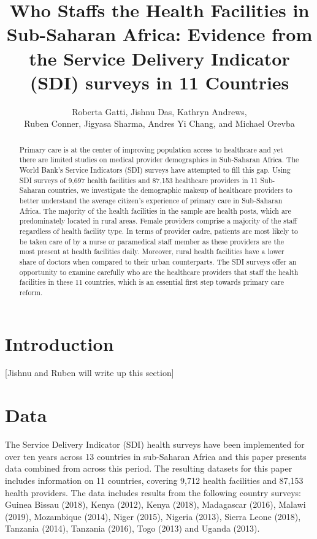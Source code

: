\documentclass{article}                 %
\title{\color{Black} Who Staffs the Health Facilities in Sub-Saharan Africa: Evidence from the Service Delivery Indicator (SDI) surveys in 11 Countries}
\author{\color{Black} Roberta Gatti, Jishnu Das, Kathryn  Andrews, \\
	Ruben Conner,  Jigyasa Sharma, Andres Yi Chang, and Michael Orevba}
\begin{document}
	
	\maketitle        
	\sectionfont{\color{Black}}
	

	\begin{abstract}
		Primary care is at the center of improving population access to healthcare and yet there are limited studies on medical provider demographics in Sub-Saharan Africa. The World Bank’s Service Indicators (SDI) surveys have attempted to fill this gap. Using SDI surveys of 9,697 health facilities and 87,153 healthcare providers in 11 Sub-Saharan countries, we investigate the demographic makeup of healthcare providers to better understand the average citizen’s experience of primary care in Sub-Saharan Africa. The majority of the health facilities in the sample are health posts, which are predominately located in rural areas. Female providers comprise a majority of the staff regardless of health facility type. In terms of provider cadre, patients are most likely to be taken care of by a nurse or paramedical staff member as these providers are the most present at health facilities daily. Moreover, rural health facilities have a lower share of doctors when compared to their urban counterparts. The SDI surveys offer an opportunity to examine carefully who are the healthcare providers that staff the health facilities in these 11 countries, which is an essential first step towards primary care reform.
	\end{abstract}
	
	\vspace{40mm}
	
	\section{Introduction}
	
	[Jishnu and Ruben will write up this section]
	
	\section{Data}
	
	The Service Delivery Indicator  (SDI) health surveys have been implemented for over ten years across 13 countries in sub-Saharan Africa and this paper presents data combined from across this period. The resulting datasets for this paper includes information on 11 countries, covering 9,712 health facilities and  87,153 health providers. The data includes results from the following country surveys: Guinea Bissau (2018), Kenya (2012),  Kenya (2018), Madagascar (2016), Malawi (2019),  Mozambique (2014), Niger (2015), Nigeria (2013), Sierra Leone (2018), Tanzania (2014), Tanzania (2016), Togo (2013) and Uganda (2013).
	
\end{document}
